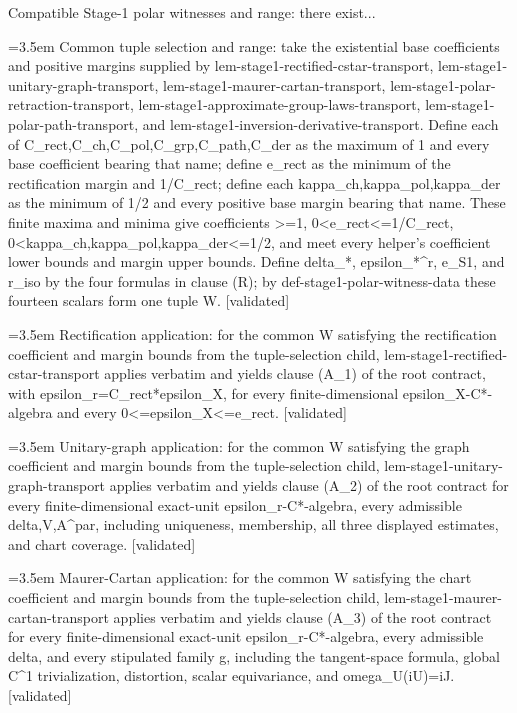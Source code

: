 \documentclass{article}
\newcommand{\step}[1]{\par\noindent\hangindent=3.5em\hangafter=1%
  \makebox[3.5em][l]{\textbf{#1.}}}
\newcommand{\steptag}[1]{\hfill{\small\textsf{[#1]}}}
\begin{document}
\begin{proofbox}{Compatible Stage-1 polar witnesses and range: there exist...}
\step{1.1.1} Common tuple selection and range: take the existential base coefficients and positive margins supplied by lem-stage1-rectified-cstar-transport, lem-stage1-unitary-graph-transport, lem-stage1-maurer-cartan-transport, lem-stage1-polar-retraction-transport, lem-stage1-approximate-group-laws-transport, lem-stage1-polar-path-transport, and lem-stage1-inversion-derivative-transport. Define each of C\_rect,C\_ch,C\_pol,C\_grp,C\_path,C\_der as the maximum of 1 and every base coefficient bearing that name; define e\_rect as the minimum of the rectification margin and 1/C\_rect; define each kappa\_ch,kappa\_pol,kappa\_der as the minimum of 1/2 and every positive base margin bearing that name. These finite maxima and minima give coefficients >=1, 0<e\_rect<=1/C\_rect, 0<kappa\_ch,kappa\_pol,kappa\_der<=1/2, and meet every helper's coefficient lower bounds and margin upper bounds. Define delta\_*, epsilon\_*\textasciicircum{}r, e\_S1, and r\_iso by the four formulas in clause (R); by def-stage1-polar-witness-data these fourteen scalars form one tuple W. \steptag{validated} \\[4pt]
\step{1.1.2} Rectification application: for the common W satisfying the rectification coefficient and margin bounds from the tuple-selection child, lem-stage1-rectified-cstar-transport applies verbatim and yields clause (A\_1) of the root contract, with epsilon\_r=C\_rect*epsilon\_X, for every finite-dimensional epsilon\_X-C*-algebra and every 0<=epsilon\_X<=e\_rect. \steptag{validated} \\[4pt]
\step{1.1.3} Unitary-graph application: for the common W satisfying the graph coefficient and margin bounds from the tuple-selection child, lem-stage1-unitary-graph-transport applies verbatim and yields clause (A\_2) of the root contract for every finite-dimensional exact-unit epsilon\_r-C*-algebra, every admissible delta,V,A\textasciicircum{}par, including uniqueness, membership, all three displayed estimates, and chart coverage. \steptag{validated} \\[4pt]
\step{1.1.4} Maurer-Cartan application: for the common W satisfying the chart coefficient and margin bounds from the tuple-selection child, lem-stage1-maurer-cartan-transport applies verbatim and yields clause (A\_3) of the root contract for every finite-dimensional exact-unit epsilon\_r-C*-algebra, every admissible delta, and every stipulated family g, including the tangent-space formula, global C\textasciicircum{}1 trivialization, distortion, scalar equivariance, and omega\_U(iU)=iJ. \steptag{validated} \\[4pt]

\end{proofbox}
\end{document}
